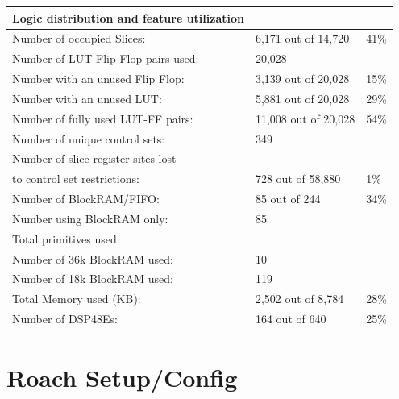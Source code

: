 \documentclass[letterpaper,10pt,english]{sphinxmanual}
\begin{document}
\begin{tabulary}{\linewidth}{|L|L|L|}
\hline
\textbf{
Logic distribution and feature utilization
} & \textbf{} & \textbf{}\\\hline

Number of occupied Slices:
 & 
6,171 out of  14,720
 & 
41\%
\\\hline

Number of LUT Flip Flop pairs used:
 & 
20,028
 & \\\hline

Number with an unused Flip Flop:
 & 
3,139 out of  20,028
 & 
15\%
\\\hline

Number with an unused LUT:
 & 
5,881 out of  20,028
 & 
29\%
\\\hline

Number of fully used LUT-FF pairs:
 & 
11,008 out of  20,028
 & 
54\%
\\\hline

Number of unique control sets:
 & 
349
 & \\\hline

Number of slice register sites lost
 &  & \\\hline

to control set restrictions:
 & 
728 out of  58,880
 & 
1\%
\\\hline

Number of BlockRAM/FIFO:
 & 
85 out of     244
 & 
34\%
\\\hline

Number using BlockRAM only:
 & 
85
 & \\\hline

Total primitives used:
 &  & \\\hline

Number of 36k BlockRAM used:
 & 
10
 & \\\hline

Number of 18k BlockRAM used:
 & 
119
 & \\\hline

Total Memory used (KB):
 & 
2,502 out of   8,784
 & 
28\%
\\\hline

Number of DSP48Es:
 & 
164 out of     640
 & 
25\%
\\\hline
\end{tabulary}



\chapter{Roach Setup/Config}
\label{ip_allocation:roach-setup-config}\label{ip_allocation::doc}
\end{document}
